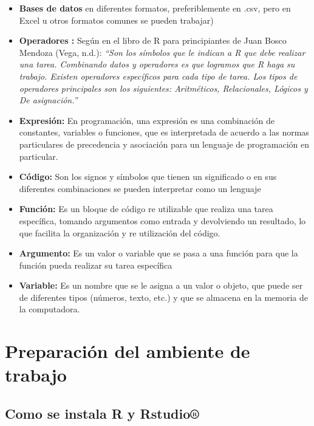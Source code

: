 \documentclass[
  letterpaper,
  DIV=11,
  numbers=noendperiod]{scrreprt}
\begin{document}
\begin{itemize}
  archivo .Rproj fuera de R), la carpeta de trabajo se establecerá
  automáticamente en el directorio donde se encuentra el archivo .RProj.
\item
  \textbf{Bases de datos} en diferentes formatos, preferiblemente en
  .csv, pero en Excel u otros formatos comunes se pueden trabajar)
\item
  \textbf{Operadores :} Según en el libro de R para principiantes de
  Juan Bosco Mendoza (Vega, n.d.): \emph{``Son los símbolos que le
  indican a R que debe realizar una tarea. Combinando datos y operadores
  es que logramos que R haga su trabajo. Existen operadores específicos
  para cada tipo de tarea. Los tipos de operadores principales son los
  siguientes: Aritméticos, Relacionales, Lógicos y De asignación.''}
\item
  \textbf{Expresión:} En programación, una expresión es una combinación
  de constantes, variables o funciones, que es interpretada de acuerdo a
  las normas particulares de precedencia y asociación para un lenguaje
  de programación en particular.
\item
  \textbf{Código:} Son los signos y símbolos que tienen un significado o
  en sus diferentes combinaciones se pueden interpretar como un lenguaje
\item
  \textbf{Función:} Es un bloque de código re utilizable que realiza una
  tarea específica, tomando argumentos como entrada y devolviendo un
  resultado, lo que facilita la organización y re utilización del
  código.
\item
  \textbf{Argumento:} Es un valor o variable que se pasa a una función
  para que la función pueda realizar su tarea específica
\item
  \textbf{Variable:} Es un nombre que se le asigna a un valor o objeto,
  que puede ser de diferentes tipos (números, texto, etc.) y que se
  almacena en la memoria de la computadora.
\end{itemize}


\chapter{Preparación del ambiente de
trabajo}\label{preparaciuxf3n-del-ambiente-de-trabajo}

\section{Como se instala R y
Rstudio®}\label{como-se-instala-r-y-rstudio}
\end{document}
